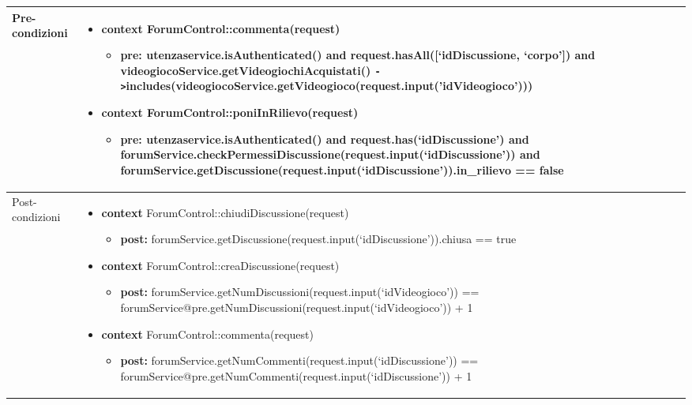 \small\begin{tabular}{|| l | p{28em} ||} 
\hline
Pre-condizioni & \begin{itemize}[leftmargin=*]
	\item \textbf{context} ForumControl::commenta(request)
	\begin{itemize}
		\item[ ] \textbf{pre:} utenzaservice.isAuthenticated()
		and request.hasAll([‘idDiscussione, ‘corpo’])
		and videogiocoService.getVideogiochiAcquistati() \verb|->|includes(\newline videogiocoService.getVideogioco(\newline request.input('idVideogioco')))	
	\end{itemize}

	\item \textbf{context} ForumControl::poniInRilievo(request)
	\begin{itemize}
		\item[ ] \textbf{pre:} utenzaservice.isAuthenticated() and request.has(‘idDiscussione’) and forumService\newline .checkPermessiDiscussione(request.input(‘idDiscussione’)) and forumService\newline .getDiscussione(request.input(‘idDiscussione’)).in\_rilievo == false
	\end{itemize}
\end{itemize}\\
\hline
Post-condizioni & \begin{itemize}[leftmargin=*]
	\item \textbf{context} ForumControl::chiudiDiscussione(request)
	\begin{itemize}
		\item[ ] \textbf{post:} forumService.getDiscussione(\newline request.input(‘idDiscussione’)).chiusa == true
	\end{itemize}

	\item \textbf{context} ForumControl::creaDiscussione(request)
	\begin{itemize}
		\item[ ] \textbf{post:} forumService.getNumDiscussioni(\newline request.input(‘idVideogioco’)) == forumService@pre.getNumDiscussioni(request.input(‘idVideogioco’)) + 1
	\end{itemize}

	\item \textbf{context} ForumControl::commenta(request)
	\begin{itemize}
		\item[ ] \textbf{post:} forumService\newline .getNumCommenti(request.input(‘idDiscussione’)) == forumService\newline @pre.getNumCommenti(request.input(‘idDiscussione’)) + 1
	\end{itemize}


\end{itemize}
\end{tabular}
